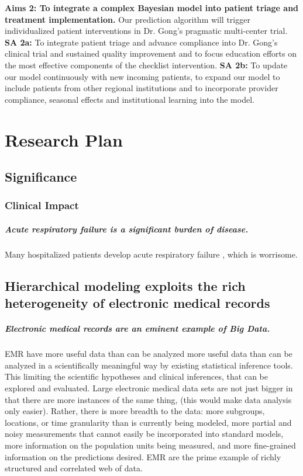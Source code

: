 \documentclass[11pt,notitlepage]{article}
\begin{document}
\textbf{Aims 2: To integrate a complex Bayesian model into patient triage and treatment implementation.} \newline Our prediction algorithm will trigger individualized patient interventions in Dr. Gong's pragmatic multi-center trial. 
\newline \textbf{SA 2a:} To integrate patient triage and advance compliance into Dr. Gong's clinical trial and sustained quality improvement and to focus education efforts on the most effective components of the checklist intervention.
\newline \textbf{SA 2b:} To update our model continuously with new incoming patients, to expand our model to include patients from other regional institutions and to incorporate provider compliance, seasonal effects and institutional learning into the model.

\newpage
\section*{Research Plan}


\subsection*{Significance}

\subsubsection*{Clinical Impact}

\subparagraph{Acute respiratory failure is a significant burden of disease.}
Many hospitalized patients develop acute respiratory failure \cite{shinystan}, which is worrisome.

\subsection*{Hierarchical modeling exploits the rich heterogeneity of electronic medical records}

\subparagraph{Electronic medical records are an eminent example of Big Data. }
EMR have more useful data than can be analyzed more useful data than can be analyzed in a scientifically meaningful way by existing statistical inference tools. This limiting the scientific hypotheses and clinical inferences, that can be explored and evaluated. Large electronic medical data sets are not just bigger in that there are more instances of the same thing, (this would make data analysis only easier). Rather, there is more breadth to the data: more subgroups, locations, or time granularity than is currently being modeled, more partial and noisy measurements that cannot easily be incorporated into standard models, more information on the population units being measured, and more fine-grained information on the predictions desired. EMR are the prime example of richly structured and correlated web of data.
\end{document}
